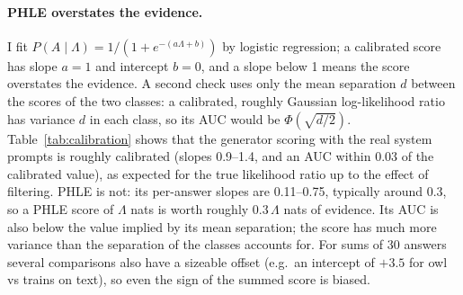 \documentclass{article}
\newcommand{\phle}{PHLE\xspace}
\begin{document}
\paragraph{\phle overstates the evidence.}
I fit $P(A \mid \Lambda) = 1/(1+e^{-(a\Lambda + b)})$ by logistic regression; a calibrated score has slope $a = 1$ and intercept $b = 0$, and a slope below 1 means the score overstates the evidence.
A second check uses only the mean separation $d$ between the scores of the two classes: a calibrated, roughly Gaussian log-likelihood ratio has variance $d$ in each class, so its AUC would be $\Phi(\sqrt{d/2})$.
Table~\ref{tab:calibration} shows that the generator scoring with the real system prompts is roughly calibrated (slopes 0.9--1.4, and an AUC within 0.03 of the calibrated value), as expected for the true likelihood ratio up to the effect of filtering.
\phle is not: its per-answer slopes are 0.11--0.75, typically around 0.3, so a \phle score of $\Lambda$ nats is worth roughly $0.3\,\Lambda$ nats of evidence.
Its AUC is also below the value implied by its mean separation; the score has much more variance than the separation of the classes accounts for.
For sums of 30 answers several comparisons also have a sizeable offset (e.g.\ an intercept of $+3.5$ for owl vs trains on text), so even the sign of the summed score is biased.

\begin{table}[h]
  \centering
  \caption{Calibration of the per-answer score. AUC, the AUC a calibrated score with the same mean separation would have, and the logistic calibration slope, for Olmo base \phle; the slope and intercept for sums of 30 answers; and the AUC and slope of the generator scoring with the real system prompts. A calibrated score has slope 1 and intercept 0. Where the two classes are perfectly separated (owl vs no prompt on text at $k=30$) the slope is not determined and the entries 1.00 / 0.00 are not meaningful.}
  \label{tab:calibration}
  
\end{table}
\end{document}
